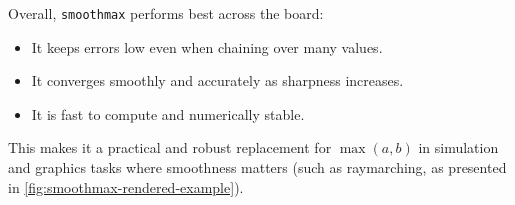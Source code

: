 Overall, \texttt{smoothmax} performs best across the board:
\begin{itemize}
    \item It keeps errors low even when chaining over many values.
    \item It converges smoothly and accurately as sharpness increases.
    \item It is fast to compute and numerically stable.
\end{itemize}

This makes it a practical and robust replacement for $\max(a, b)$ in simulation and graphics tasks where smoothness matters (such as raymarching, as presented in \cref{fig:smoothmax-rendered-example}).